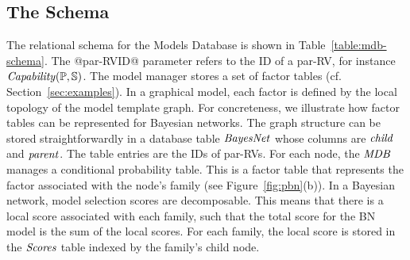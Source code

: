 \subsection{The \MDB Schema}
The relational schema for the Models Database is shown in Table~\ref{table:mdb-schema}. The @par-RVID@ parameter refers to the ID  of a par-RV, for instance $\it{Capability}(\P,\S)$.
The model manager stores a set of factor tables (cf. Section~\ref{sec:examples}). In a graphical model, each factor is defined by the local topology of the model template graph. For concreteness, we illustrate how factor tables can be represented  for Bayesian networks. The graph structure can be stored straightforwardly in a database table $\it{BayesNet}$ whose columns are $\it{child}$ and $\it{parent}$. The table entries are the IDs of par-RVs. 
For each node, the $\MDB$ manages a conditional probability table. This is a factor table that represents the factor associated with the node's family (see Figure~\ref{fig:pbn}(b)).
%
%
In a Bayesian network, model selection scores are decomposable. This means that there is a local score associated with each family, such that the total score for the BN model is the sum of the local scores. For each family, the local score is stored in the $\it{Scores}$ table indexed by the family's child node.


